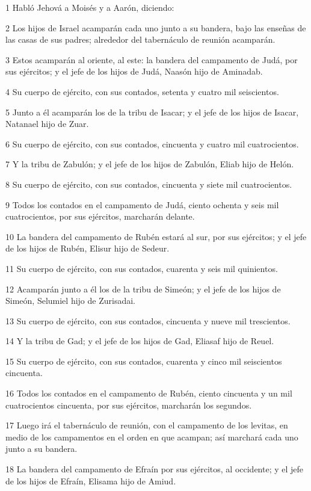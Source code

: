 \par 1 Habló Jehová a Moisés y a Aarón, diciendo:
\par 2 Los hijos de Israel acamparán cada uno junto a su bandera, bajo las enseñas de las casas de sus padres; alrededor del tabernáculo de reunión acamparán.
\par 3 Estos acamparán al oriente, al este: la bandera del campamento de Judá, por sus ejércitos; y el jefe de los hijos de Judá, Naasón hijo de Aminadab.
\par 4 Su cuerpo de ejército, con sus contados, setenta y cuatro mil seiscientos.
\par 5 Junto a él acamparán los de la tribu de Isacar; y el jefe de los hijos de Isacar, Natanael hijo de Zuar.
\par 6 Su cuerpo de ejército, con sus contados, cincuenta y cuatro mil cuatrocientos.
\par 7 Y la tribu de Zabulón; y el jefe de los hijos de Zabulón, Eliab hijo de Helón. 
\par 8 Su cuerpo de ejército, con sus contados, cincuenta y siete mil cuatrocientos.
\par 9 Todos los contados en el campamento de Judá, ciento ochenta y seis mil cuatrocientos, por sus ejércitos, marcharán delante.
\par 10 La bandera del campamento de Rubén estará al sur, por sus ejércitos; y el jefe de los hijos de Rubén, Elisur hijo de Sedeur.
\par 11 Su cuerpo de ejército, con sus contados, cuarenta y seis mil quinientos.
\par 12 Acamparán junto a él los de la tribu de Simeón; y el jefe de los hijos de Simeón, Selumiel hijo de Zurisadai.
\par 13 Su cuerpo de ejército, con sus contados, cincuenta y nueve mil trescientos.
\par 14 Y la tribu de Gad; y el jefe de los hijos de Gad, Eliasaf hijo de Reuel.
\par 15 Su cuerpo de ejército, con sus contados, cuarenta y cinco mil seiscientos cincuenta.
\par 16 Todos los contados en el campamento de Rubén, ciento cincuenta y un mil cuatrocientos cincuenta, por sus ejércitos, marcharán los segundos.
\par 17 Luego irá el tabernáculo de reunión, con el campamento de los levitas, en medio de los campamentos en el orden en que acampan; así marchará cada uno junto a su bandera.
\par 18 La bandera del campamento de Efraín por sus ejércitos, al occidente; y el jefe de los hijos de Efraín, Elisama hijo de Amiud.
